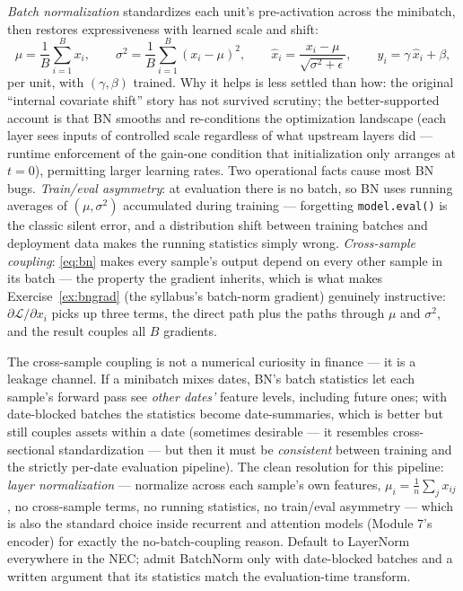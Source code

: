 \documentclass[11pt]{article}
\numberwithin{equation}{section}
\theoremstyle{plain}
\theoremstyle{definition}
\theoremstyle{remark}
\begin{document}
\emph{Batch normalization} standardizes each unit's pre-activation across the minibatch, then restores expressiveness with learned scale and shift:
\begin{equation}
\mu = \frac1B \sum_{i=1}^B x_i,
\qquad
\sigma^2 = \frac1B \sum_{i=1}^B (x_i - \mu)^2,
\qquad
\hat x_i = \frac{x_i - \mu}{\sqrt{\sigma^2 + \epsilon}},
\qquad
y_i = \gamma\, \hat x_i + \beta ,
\label{eq:bn}
\end{equation}
per unit, with $(\gamma, \beta)$ trained. Why it helps is less settled than how: the original ``internal covariate shift'' story has not survived scrutiny; the better-supported account is that BN smooths and re-conditions the optimization landscape (each layer sees inputs of controlled scale regardless of what upstream layers did --- runtime enforcement of the gain-one condition that initialization only arranges at $t = 0$), permitting larger learning rates. Two operational facts cause most BN bugs. \emph{Train/eval asymmetry}: at evaluation there is no batch, so BN uses running averages of $(\mu, \sigma^2)$ accumulated during training --- forgetting \texttt{model.eval()} is the classic silent error, and a distribution shift between training batches and deployment data makes the running statistics simply wrong. \emph{Cross-sample coupling}: \eqref{eq:bn} makes every sample's output depend on every other sample in its batch --- the property the gradient inherits, which is what makes Exercise~\ref{ex:bngrad} (the syllabus's batch-norm gradient) genuinely instructive: $\partial \mathcal{L}/\partial x_i$ picks up three terms, the direct path plus the paths through $\mu$ and $\sigma^2$, and the result couples all $B$ gradients.

\begin{necbox}
The cross-sample coupling is not a numerical curiosity in finance --- it is a leakage channel. If a minibatch mixes dates, BN's batch statistics let each sample's forward pass see \emph{other dates'} feature levels, including future ones; with date-blocked batches the statistics become date-summaries, which is better but still couples assets within a date (sometimes desirable --- it resembles cross-sectional standardization --- but then it must be \emph{consistent} between training and the strictly per-date evaluation pipeline). The clean resolution for this pipeline: \emph{layer normalization} --- normalize across each sample's own features, $\mu_i = \tfrac1n\sum_j x_{ij}$, no cross-sample terms, no running statistics, no train/eval asymmetry --- which is also the standard choice inside recurrent and attention models (Module 7's encoder) for exactly the no-batch-coupling reason. Default to LayerNorm everywhere in the NEC; admit BatchNorm only with date-blocked batches and a written argument that its statistics match the evaluation-time transform.
\end{necbox}
\end{document}
